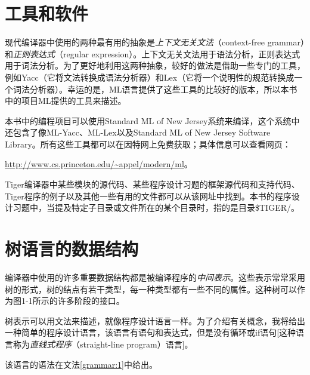 \documentclass[cn,11pt,chinese]{elegantbook}
\begin{document}
\section{工具和软件}

现代编译器中使用的两种最有用的抽象是\textit{上下文无关文法}（context-free grammar）和\textit{正则表达式}（regular expression）。上下文无关文法用于语法分析，正则表达式用于词法分析。为了更好地利用这两种抽象，较好的做法是借助一些专门的工具，例如Yacc（它将文法转换成语法分析器）和Lex（它将一个说明性的规范转换成一个词法分析器）。幸运的是，ML语言提供了这些工具的比较好的版本，所以本书中的项目ML提供的工具来描述。

本书中的编程项目可以使用Standard ML of New Jersey系统来编译，这个系统中还包含了像ML-Yacc、ML-Lex以及Standard ML of New Jersey Software Library。所有这些工具都可以在因特网上免费获取；具体信息可以查看网页：

\href{http://www.cs.princeton.edu/\textasciitilde appel/modern/ml}{http://www.cs.princeton.edu/\textasciitilde appel/modern/ml}。

Tiger编译器中某些模块的源代码、某些程序设计习题的框架源代码和支持代码、Tiger程序的例子以及其他一些有用的文件都可以从该网址中找到。本书的程序设计习题中，当提及特定子目录或文件所在的某个目录时，指的是目录\$TIGER/。

\section{树语言的数据结构}

编译器中使用的许多重要数据结构都是被编译程序的\textit{中间表示}。这些表示常常采用树的形式，树的结点有若干类型，每一种类型都有一些不同的属性。这种树可以作为图1-1所示的许多阶段的接口。

树表示可以用文法来描述，就像程序设计语言一样。为了介绍有关概念，我将给出一种简单的程序设计语言，该语言有语句和表达式，但是没有循环或if语句[这种语言称为\textit{直线式程序}（straight-line program）语言]。

该语言的语法在文法\ref{grammar:1}中给出。
\end{document}
